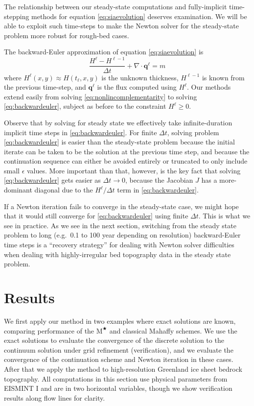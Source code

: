 \documentclass[review,letterpaper]{igs}
\newcommand\bq{\mathbf{q}}
\newcommand{\Div}{\nabla\cdot}
\newcommand\eps{\epsilon}
\newcommand{\Mstar}{$\text{M}^{\bigstar}$\xspace}
\begin{document}
The relationship between our steady-state computations and fully-implicit time-stepping methods for equation \eqref{eq:siaevolution} deserves examination.  We will be able to exploit such time-steps to make the Newton solver for the steady-state problem more robust for rough-bed cases.

The backward-Euler \citep{MortonMayers2005} approximation of equation \eqref{eq:siaevolution} is
\begin{equation}
\frac{H^\ell - H^{\ell-1}}{\Delta t} + \Div \bq^\ell = m \label{eq:backwardeuler}
\end{equation}
where $H^\ell(x,y) \approx H(t_\ell,x,y)$ is the unknown thickness, $H^{\ell-1}$ is known from the previous time-step, and $\bq^\ell$ is the flux computed using $H^\ell$.  Our methods extend easily from solving \eqref{eq:nonlincomplementarity} to solving \eqref{eq:backwardeuler}, subject as before to the constraint $H^\ell\ge 0$.

Observe that by solving for steady state we effectively take infinite-duration implicit time steps in \eqref{eq:backwardeuler}.  For finite $\Delta t$, solving problem \eqref{eq:backwardeuler} is easier than the steady-state problem because the initial iterate can be taken to be the solution at the previous time step, and because the continuation sequence can either be avoided entirely or truncated to only include small $\eps$ values.  More important than that, however, is the key fact that solving \eqref{eq:backwardeuler} gets easier as $\Delta t\to 0$, because the Jacobian $J$ has a more-dominant diagonal due to the $H^\ell/\Delta t$ term in \eqref{eq:backwardeuler}.

If a Newton iteration fails to converge in the steady-state case, we might hope that it would still converge for \eqref{eq:backwardeuler} using finite $\Delta t$.  This is what we see in practice.  As we see in the next section, switching from the steady state problem to long (e.g.~0.1 to 100 year depending on resolution) backward-Euler time steps is a ``recovery strategy'' for dealing with Newton solver difficulties when dealing with highly-irregular bed topography data in the steady state problem.


\section{Results}

We first apply our method in two examples where exact solutions are known, comparing performance of the \Mstar and classical Mahaffy schemes.  We use the exact solutions to evaluate the convergence of the discrete solution to the continuum solution under grid refinement (verification), and we evaluate the convergence of the continuation scheme and Newton iteration in these cases.  After that we apply the method to high-resolution Greenland ice sheet bedrock topography.  All computations in this section use physical parameters from EISMINT I \citep{Huybrechtsetal1996} and are in two horizontal variables, though we show verification results along flow lines for clarity.
\end{document}
